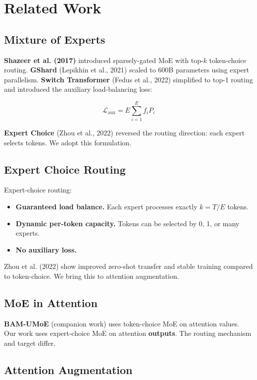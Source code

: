 \section{Related Work}

\subsection{Mixture of Experts}

\textbf{Shazeer et al. (2017)} introduced sparsely-gated MoE with top-$k$ 
token-choice routing. \textbf{GShard} (Lepikhin et al., 2021) scaled to 600B 
parameters using expert parallelism. \textbf{Switch Transformer} (Fedus et al., 
2022) simplified to top-1 routing and introduced the auxiliary 
load-balancing loss:

\[
\mathcal{L}_\text{aux} = E \sum_{i=1}^{E} f_i P_i
\tag{2.1}
\]

\textbf{Expert Choice} (Zhou et al., 2022) reversed the routing direction:
each expert selects tokens. We adopt this formulation.

\subsection{Expert Choice Routing}

Expert-choice routing:

\begin{itemize}
\item \textbf{Guaranteed load balance.} Each expert processes exactly $k = T / E$
  tokens.
\item \textbf{Dynamic per-token capacity.} Tokens can be selected by 0, 1, or many
  experts.
\item \textbf{No auxiliary loss.}

\end{itemize}
Zhou et al. (2022) show improved zero-shot transfer and stable training 
compared to token-choice. We bring this to attention augmentation.

\subsection{MoE in Attention}

\textbf{BAM-UMoE} (companion work) uses token-choice MoE on attention values. 
Our work uses expert-choice MoE on attention \textbf{outputs}. The routing 
mechanism and target differ.

\subsection{Attention Augmentation}

